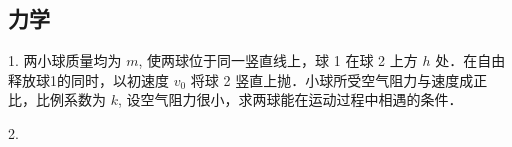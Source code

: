 
\subsection{力学}
1. 两小球质量均为 $m$, 使两球位于同一竖直线上，球 1 在球 2 上方 $h$ 处．在自由释放球1的同时，以初速度 $v_{0}$ 将球 2 竖直上抛．小球所受空气阻力与速度成正比，比例系数为 $k$, 设空气阻力很小，求两球能在运动过程中相遇的条件．

2. 